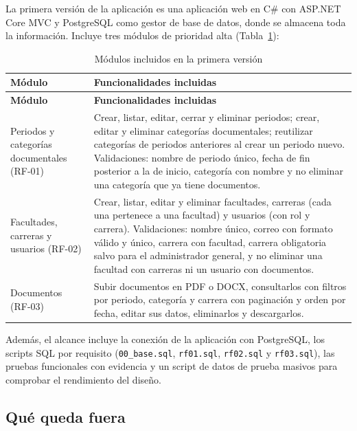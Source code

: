 \documentclass[12pt,a4paper,oneside]{article}
\begin{document}
La primera versión de la aplicación es una aplicación web en C\# con ASP.NET Core MVC
y PostgreSQL como gestor de base de datos, donde se almacena toda la información. Incluye
tres módulos de prioridad alta (Tabla~\ref{tab:modulos}):

\begin{longtable}{>{\raggedright\arraybackslash}p{3.7cm}>{\raggedright\arraybackslash}p{11.3cm}}
\caption{Módulos incluidos en la primera versión}\label{tab:modulos}\\
\toprule
\textbf{Módulo} & \textbf{Funcionalidades incluidas} \\
\midrule
\endfirsthead
\toprule
\textbf{Módulo} & \textbf{Funcionalidades incluidas} \\
\midrule
\endhead
Periodos y categorías documentales (RF-01) &
Crear, listar, editar, cerrar y eliminar periodos; crear, editar y eliminar categorías
documentales; reutilizar categorías de periodos anteriores al crear un periodo nuevo.
Validaciones: nombre de periodo único, fecha de fin posterior a la de inicio, categoría
con nombre y no eliminar una categoría que ya tiene documentos. \\
\addlinespace
Facultades, carreras y usuarios (RF-02) &
Crear, listar, editar y eliminar facultades, carreras (cada una pertenece a una facultad)
y usuarios (con rol y carrera). Validaciones: nombre único, correo con formato válido y
único, carrera con facultad, carrera obligatoria salvo para el administrador general, y
no eliminar una facultad con carreras ni un usuario con documentos. \\
\addlinespace
Documentos (RF-03) &
Subir documentos en PDF o DOCX, consultarlos con filtros por periodo, categoría y carrera
con paginación y orden por fecha, editar sus datos, eliminarlos y descargarlos. \\
\bottomrule
\end{longtable}

Además, el alcance incluye la conexión de la aplicación con PostgreSQL, los scripts SQL
por requisito (\texttt{00\_base.sql}, \texttt{rf01.sql}, \texttt{rf02.sql} y
\texttt{rf03.sql}), las pruebas funcionales con evidencia y un script de datos de prueba
masivos para comprobar el rendimiento del diseño.

\subsection{Qué queda fuera}
\end{document}
